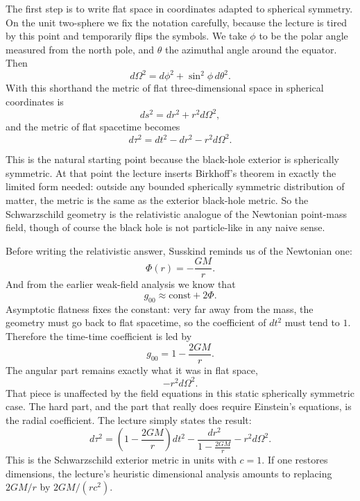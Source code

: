 The first step is to write flat space in coordinates adapted to spherical symmetry. On the unit two-sphere we fix the notation carefully, because the lecture is tired by this point and temporarily flips the symbols. We take \(\phi\) to be the polar angle measured from the north pole, and \(\theta\) the azimuthal angle around the equator. Then
\begin{equation}
d\Omega^2 = d\phi^2+\sin^2\phi\,d\theta^2.
\end{equation}
With this shorthand the metric of flat three-dimensional space in spherical coordinates is
\begin{equation}
ds^2 = dr^2+r^2d\Omega^2,
\end{equation}
and the metric of flat spacetime becomes
\begin{equation}
d\tau^2 = dt^2-dr^2-r^2d\Omega^2.
\end{equation}

This is the natural starting point because the black-hole exterior is spherically symmetric. At that point the lecture inserts Birkhoff's theorem in exactly the limited form needed: outside any bounded spherically symmetric distribution of matter, the metric is the same as the exterior black-hole metric. So the Schwarzschild geometry is the relativistic analogue of the Newtonian point-mass field, though of course the black hole is not particle-like in any naive sense.

Before writing the relativistic answer, Susskind reminds us of the Newtonian one:
\begin{equation}
\Phi(r)=-\frac{GM}{r}.
\end{equation}
And from the earlier weak-field analysis we know that
\begin{equation}
g_{00}\approx \text{const}+2\Phi.
\end{equation}
Asymptotic flatness fixes the constant: very far away from the mass, the geometry must go back to flat spacetime, so the coefficient of \(dt^2\) must tend to \(1\). Therefore the time-time coefficient is led by
\begin{equation}
g_{00}=1-\frac{2GM}{r}.
\end{equation}
The angular part remains exactly what it was in flat space,
\[
-r^2d\Omega^2.
\]
That piece is unaffected by the field equations in this static spherically symmetric case. The hard part, and the part that really does require Einstein's equations, is the radial coefficient. The lecture simply states the result:
\begin{equation}
d\tau^2
=
\left(1-\frac{2GM}{r}\right)dt^2
-
\frac{dr^2}{1-\frac{2GM}{r}}
-
r^2d\Omega^2.
\end{equation}
This is the Schwarzschild exterior metric in units with \(c=1\). If one restores dimensions, the lecture's heuristic dimensional analysis amounts to replacing \(2GM/r\) by \(2GM/(rc^2)\).

